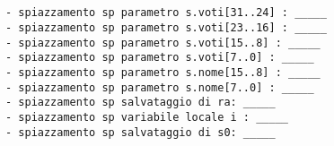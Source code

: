 
\begin{verbatim}


- spiazzamento sp parametro s.voti[31..24] : _____
- spiazzamento sp parametro s.voti[23..16] : _____
- spiazzamento sp parametro s.voti[15..8] : _____
- spiazzamento sp parametro s.voti[7..0] : _____
- spiazzamento sp parametro s.nome[15..8] : _____
- spiazzamento sp parametro s.nome[7..0] : _____
- spiazzamento sp salvataggio di ra: _____
- spiazzamento sp variabile locale i : _____ 
- spiazzamento sp salvataggio di s0: _____
  
\end{verbatim}